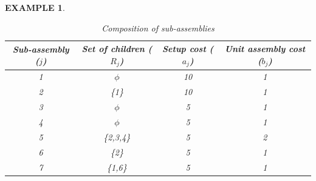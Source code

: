 \documentclass[twoside,onecolumn,12pt,letterpaper]{article}
\newtheorem{example}{EXAMPLE}
\begin{document}
\begin{example}
%
\begin{table}[htbp]
\centering
\caption{Composition of sub-assemblies}
\label{table:subassemblies_composition}
\begin{tabular}{|c|c|c|c|}
\hline
Sub-assembly ($j$) & Set of children ($R_j$) & Setup cost ($a_j$) & Unit assembly cost ($b_j$) \\ \hline
1 & $\phi$ & 10 & 1 \\
2 & \{1\} & 10 & 1 \\
3 & $\phi$ & 5 & 1 \\
4 & $\phi$ & 5 & 1 \\
5 & \{2,3,4\} & 5 & 2 \\
6 & \{2\} & 5 & 1 \\ 
7 & \{1,6\} & 5 & 1 \\ 
\hline
\end{tabular}
\end{table}


\end{example}
\end{document}
